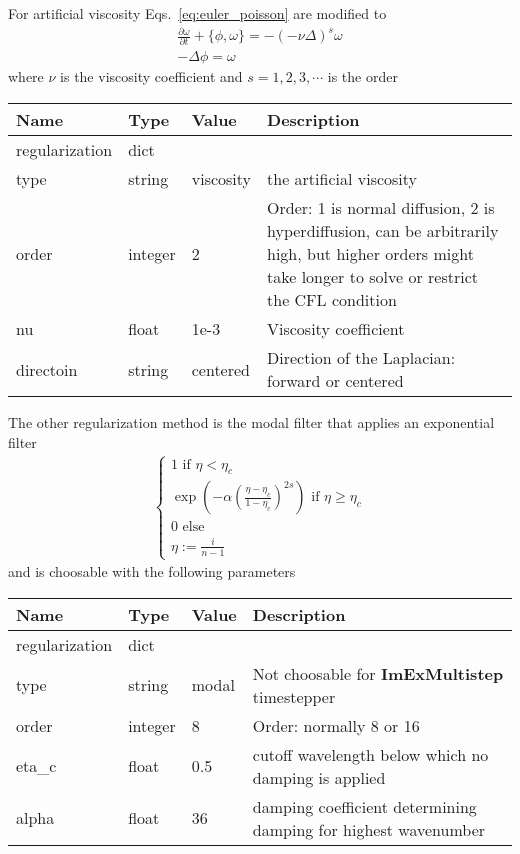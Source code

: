 For artificial viscosity Eqs.~\eqref{eq:euler_poisson} are modified to
\begin{subequations}
\begin{align}
    \frac{\partial \omega}{\partial t} + \{ \phi, \omega\} = -(-\nu \Delta)^s \omega\\
 -\Delta \phi = \omega
\end{align}
\label{eq:euler_poisson_viscous}
\end{subequations}
where $\nu$ is the viscosity coefficient and $s=1,2,3,\cdots$ is the order
\begin{longtable}{lllp{7.5cm}}
\toprule
\rowcolor{gray!50}\textbf{Name} &  \textbf{Type} & \textbf{Value}  & \textbf{Description}  \\ \midrule
regularization & dict & & \\
\qquad type  & string& viscosity & the artificial viscosity \\
\qquad order    & integer & 2 & Order: 1 is normal diffusion, 2 is hyperdiffusion, can be arbitrarily high, but higher orders might take longer to solve or restrict the CFL condition \\
\qquad nu    & float & 1e-3 & Viscosity coefficient \\
\qquad directoin & string & centered & Direction of the Laplacian: forward or centered
\bottomrule
\end{longtable}
The other regularization method is the modal filter that applies an exponential filter
\begin{align}
    \begin{cases}
    1 \text{ if } \eta < \eta_c \\
    \exp\left( -\alpha  \left(\frac{\eta-\eta_c}{1-\eta_c} \right)^{2s}\right) \text { if } \eta \geq \eta_c \\
    0 \text{ else} \\
    \eta := \frac{i}{n-1}
    \end{cases}
\end{align}
and is choosable with the following parameters
\begin{longtable}{lllp{7.5cm}}
\toprule
\rowcolor{gray!50}\textbf{Name} &  \textbf{Type} & \textbf{Value}  & \textbf{Description}  \\ \midrule
regularization & dict & & \\
\qquad type  & string& modal & Not choosable for \textbf{ImExMultistep} timestepper\\
\qquad order & integer & 8 & Order: normally 8 or 16 \\
\qquad eta\_c & float & 0.5 & cutoff wavelength below which no damping is applied \\
\qquad alpha & float & 36 & damping coefficient determining damping for highest wavenumber \\
\bottomrule
\end{longtable}
